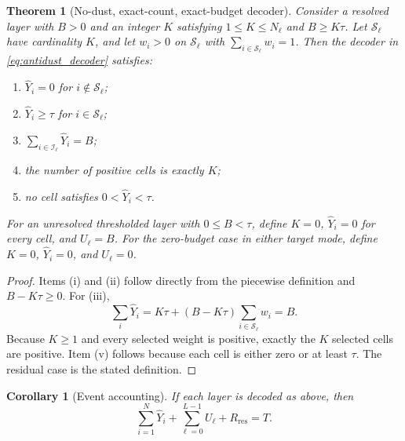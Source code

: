\documentclass[11pt]{article}
\newtheorem{theorem}[proposition]{Theorem}
\newtheorem{corollary}[proposition]{Corollary}
\theoremstyle{definition}
\theoremstyle{remark}
\begin{document}
\begin{theorem}[No-dust, exact-count, exact-budget decoder]
Consider a resolved layer with $B>0$ and an integer $K$ satisfying $1\le K\le N_\ell$ and $B\ge K\tau$. Let $\mathcal S_\ell$ have cardinality $K$, and let $w_i>0$ on $\mathcal S_\ell$ with $\sum_{i\in\mathcal S_\ell}w_i=1$. Then the decoder in \cref{eq:antidust_decoder} satisfies:
\begin{enumerate}[label=(\roman*),leftmargin=2em]
  \item $\widehat Y_i=0$ for $i\notin\mathcal S_\ell$;
  \item $\widehat Y_i\ge\tau$ for $i\in\mathcal S_\ell$;
  \item $\sum_{i\in\mathcal I_\ell}\widehat Y_i=B$;
  \item the number of positive cells is exactly $K$;
  \item no cell satisfies $0<\widehat Y_i<\tau$.
\end{enumerate}
For an unresolved thresholded layer with $0\le B<\tau$, define $K=0$, $\widehat Y_i=0$ for every cell, and $U_\ell=B$. For the zero-budget case in either target mode, define $K=0$, $\widehat Y_i=0$, and $U_\ell=0$.
\end{theorem}
\begin{proof}
Items (i) and (ii) follow directly from the piecewise definition and $B-K\tau\ge0$. For (iii),
\begin{equation}
  \sum_i\widehat Y_i
  =K\tau+(B-K\tau)\sum_{i\in\mathcal S_\ell}w_i=B.
\end{equation}
Because $K\ge1$ and every selected weight is positive, exactly the $K$ selected cells are positive. Item (v) follows because each cell is either zero or at least $\tau$. The residual case is the stated definition.
\end{proof}

\begin{corollary}[Event accounting]
If each layer is decoded as above, then
\begin{equation}
  \sum_{i=1}^{N}\widehat Y_i+\sum_{\ell=0}^{L-1}U_\ell+R_{\mathrm{res}}=T.
  \label{eq:event_accounting}
\end{equation}
\end{corollary}
\end{document}
